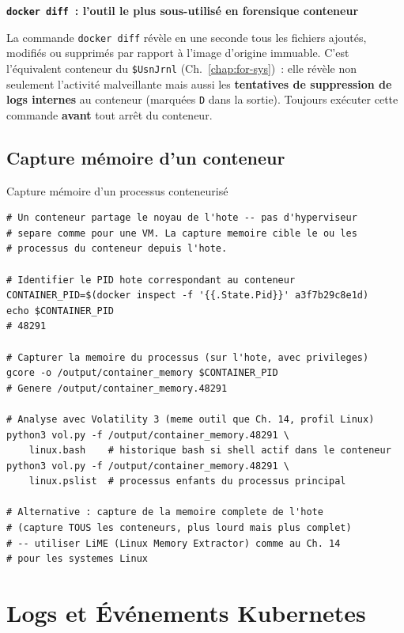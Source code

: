 \begin{boxalert}
\textbf{\texttt{docker diff}~: l'outil le plus sous-utilisé en
forensique conteneur}

La commande \texttt{docker diff} révèle en une seconde tous les
fichiers ajoutés, modifiés ou supprimés par rapport à l'image
d'origine immuable. C'est l'équivalent conteneur du \texttt{\$UsnJrnl}
(Ch.~\ref{chap:for-sys})~: elle révèle non seulement l'activité
malveillante mais aussi les \textbf{tentatives de suppression
de logs internes} au conteneur (marquées \texttt{D} dans la sortie).
Toujours exécuter cette commande \textbf{avant} tout arrêt du conteneur.
\end{boxalert}

\subsection{Capture mémoire d'un conteneur}

\begin{boxoutils}{Capture mémoire d'un processus conteneurisé}
\begin{lstlisting}[language=bash_forensique]
# Un conteneur partage le noyau de l'hote -- pas d'hyperviseur
# separe comme pour une VM. La capture memoire cible le ou les
# processus du conteneur depuis l'hote.

# Identifier le PID hote correspondant au conteneur
CONTAINER_PID=$(docker inspect -f '{{.State.Pid}}' a3f7b29c8e1d)
echo $CONTAINER_PID
# 48291

# Capturer la memoire du processus (sur l'hote, avec privileges)
gcore -o /output/container_memory $CONTAINER_PID
# Genere /output/container_memory.48291

# Analyse avec Volatility 3 (meme outil que Ch. 14, profil Linux)
python3 vol.py -f /output/container_memory.48291 \
    linux.bash    # historique bash si shell actif dans le conteneur
python3 vol.py -f /output/container_memory.48291 \
    linux.pslist  # processus enfants du processus principal

# Alternative : capture de la memoire complete de l'hote
# (capture TOUS les conteneurs, plus lourd mais plus complet)
# -- utiliser LiME (Linux Memory Extractor) comme au Ch. 14
# pour les systemes Linux
\end{lstlisting}
\end{boxoutils}

\section{Logs et Événements Kubernetes}
\label{sec:logs-k8s}


